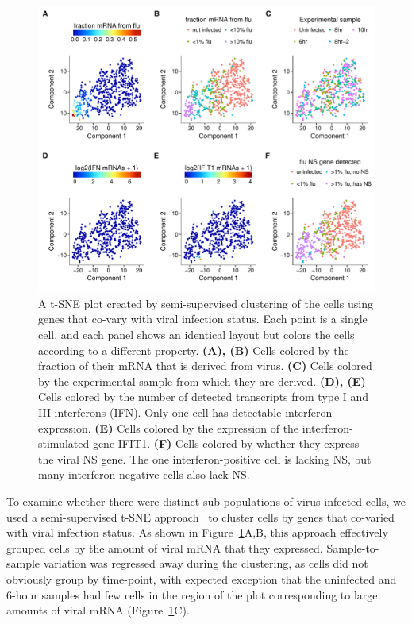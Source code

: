 \documentclass[9pt,lineno]{elife}
\begin{document}
\begin{figure}
\centerline{\includegraphics[width=0.8\linewidth]{figures/p_small_tsne_merge.pdf}}
\caption{\label{fig:tsne}
A t-SNE plot created by semi-supervised clustering of the cells using genes that co-vary with viral infection status.
Each point is a single cell, and each panel shows an identical layout but colors the cells according to a different property.
{\bf (A), (B)}
Cells colored by the fraction of their mRNA that is derived from virus.
{\bf (C)}
Cells colored by the experimental sample from which they are derived.
{\bf (D), (E)}
Cells colored by the number of detected transcripts from type I and III interferons (IFN).
Only one cell has detectable interferon expression.
{\bf (E)}
Cells colored by the expression of the interferon-stimulated gene IFIT1.
{\bf (F)}
Cells colored by whether they express the viral NS gene.
The one interferon-positive cell is lacking NS, but many interferon-negative cells also lack NS.
}

\end{figure}

To examine whether there were distinct sub-populations of virus-infected cells, we used a semi-supervised t-SNE approach~\citep{VanderMaaten:2008tm} to cluster cells by genes that co-varied with viral infection status.
As shown in Figure~\ref{fig:tsne}A,B, this approach effectively grouped cells by the amount of viral mRNA that they expressed.
Sample-to-sample variation was regressed away during the clustering, as cells did not obviously group by time-point, with expected exception that the uninfected and 6-hour samples had few cells in the region of the plot corresponding to large amounts of viral mRNA (Figure~\ref{fig:tsne}C).
\end{document}
